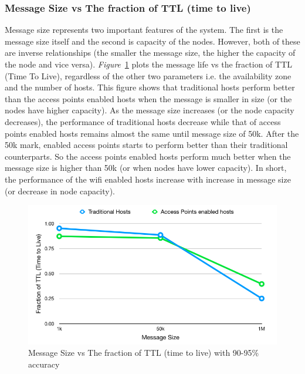 \subsubsection{Message Size vs The fraction of TTL (time to live)}
Message size represents two important features of the system. The first is the message size itself and the second is capacity of the nodes. However, both of these are inverse relationships (the smaller the message size, the higher the capacity of the node and vice versa). \emph{Figure}~\ref{fig:scenario1_message_size} plots the message life vs the fraction of TTL (Time To Live), regardless of the other two parameters i.e. the availability zone and the number of hosts. This figure shows that traditional hosts perform better than the access points enabled hosts when the message is smaller in size (or the nodes have higher capacity). As the message size increases (or the node capacity decreases), the performance of traditional hosts decrease while that of access points enabled hosts remains almost the same until message size of 50k. After the 50k mark, enabled access points starts to perform better than their traditional counterparts. So the access points enabled hosts perform much better when the message size is higher than 50k (or when nodes have lower capacity). In short, the performance of the wifi enabled hosts increase with increase in message size (or decrease in node capacity).

\begin{figure}[h]
  \centering
  \includegraphics[scale=0.45]{./figures/scenario1_message_size}
  \caption{Message Size vs The fraction of TTL (time to live) with 90-95\% accuracy}
  \label{fig:scenario1_message_size}
\end{figure}
